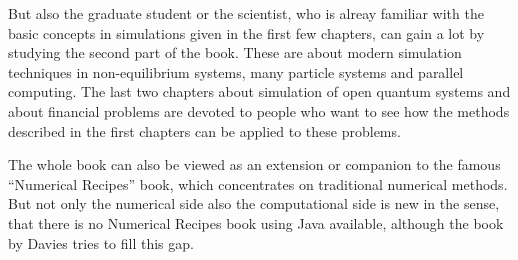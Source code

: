 \documentclass[a4paper]{book}
\begin{document}
But also the graduate student or the scientist, who is alreay familiar with the basic concepts in simulations given in the first few chapters, can gain a lot by studying the second part of the book.
These are about modern simulation techniques in non-equilibrium systems, many particle systems and parallel computing.
The last two chapters about simulation of open quantum systems and about financial problems are devoted to people who want to see how the methods described in the first chapters can be applied to these problems.

The whole book can also be viewed as an extension or companion to the famous ``Numerical Recipes'' book, which concentrates on traditional numerical methods.
But not only the numerical side also the computational side is new in the sense, that there is no Numerical Recipes book using Java available, although the book by Davies tries to fill this gap.
\end{document}
